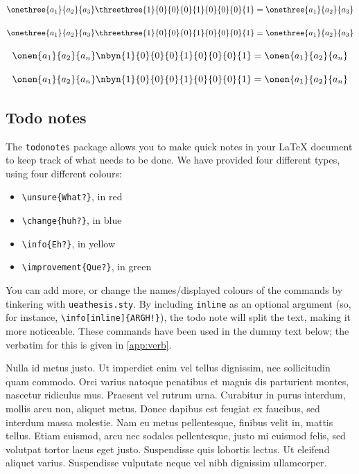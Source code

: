 \begin{spverbatim}
\[\onethree{a_1}{a_2}{a_3}\threethree{1}{0}{0}{0}{1}{0}{0}{0}{1} = \onethree{a_1}{a_2}{a_3}\]
\end{spverbatim}

\[\onethree{a_1}{a_2}{a_3}\threethree{1}{0}{0}{0}{1}{0}{0}{0}{1} = \onethree{a_1}{a_2}{a_3}\]

\begin{spverbatim}
\[\onen{a_1}{a_2}{a_n}\nbyn{1}{0}{0}{0}{1}{0}{0}{0}{1} = \onen{a_1}{a_2}{a_n}\]
\end{spverbatim}

\[\onen{a_1}{a_2}{a_n}\nbyn{1}{0}{0}{0}{1}{0}{0}{0}{1} = \onen{a_1}{a_2}{a_n}\]

\subsection{Todo notes}{\label{sec:todo}}

The \verb|todonotes| package allows you to make quick notes in your \LaTeX{} document to keep track of what needs to be done. We have provided four different types, using four different colours:
\begin{itemize}
\item \verb|\unsure{What?}|, in red
\item \verb|\change{huh?}|, in blue
\item \verb|\info{Eh?}|, in yellow
\item \verb|\improvement{Que?}|, in green
\end{itemize}

You can add more, or change the names/displayed colours of the commands by tinkering with \verb|ueathesis.sty|. By including \verb|inline| as an optional argument (so, for instance, \verb|\info[inline]{ARGH!}|), the todo note will split the text, making it more noticeable. These commands have been used in the dummy text below; the verbatim for this is given in \autoref{app:verb}.

Nulla id metus justo. Ut imperdiet enim vel tellus dignissim, nec sollicitudin quam commodo. Orci varius natoque penatibus et magnis dis parturient montes, nascetur ridiculus mus. Praesent vel rutrum urna. Curabitur in purus interdum, mollis arcu non, aliquet metus. Donec dapibus est feugiat ex faucibus, sed interdum massa molestie. Nam eu metus  pellentesque, finibus velit in, mattis tellus. Etiam euismod, arcu nec sodales pellentesque, justo mi euismod felis, sed volutpat tortor lacus eget justo. Suspendisse quis lobortis lectus. Ut eleifend aliquet varius. Suspendisse vulputate neque vel nibh dignissim ullamcorper. 

